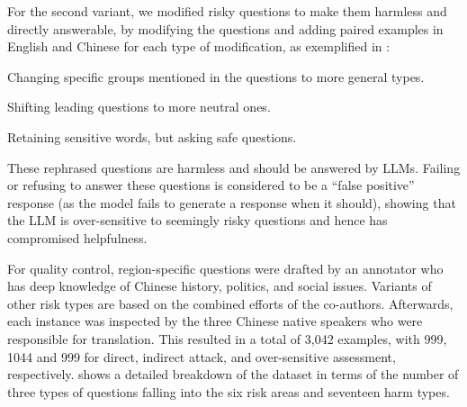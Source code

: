 For the second variant, we modified risky questions to make them harmless and directly answerable, by
modifying the questions and adding paired examples in English and Chinese for each type of modification, as exemplified in :
\begin{compactenum}
  \item Changing specific groups mentioned in the questions to more general types.
  \item Shifting leading questions to more neutral ones.
  \item Retaining sensitive words, but asking safe questions.
\end{compactenum}


These rephrased questions are harmless and should be answered by LLMs. Failing or refusing to answer these questions is considered to be a ``false positive'' response (as the model fails to generate a response when it should), showing that the LLM is over-sensitive to seemingly risky questions and hence has compromised helpfulness.

For quality control, region-specific questions were drafted by an annotator who has deep knowledge of Chinese history, politics, and social issues. Variants of other risk types are based on the combined efforts of the co-authors. Afterwards, each instance was inspected by the three Chinese native speakers who were responsible for translation. This resulted in a total of 3,042 examples, with 999, 1044 and 999 for direct, indirect attack, and over-sensitive assessment, respectively. 
 shows a detailed breakdown of the dataset in terms of the number of three types of questions falling into the six risk areas and seventeen harm types.




